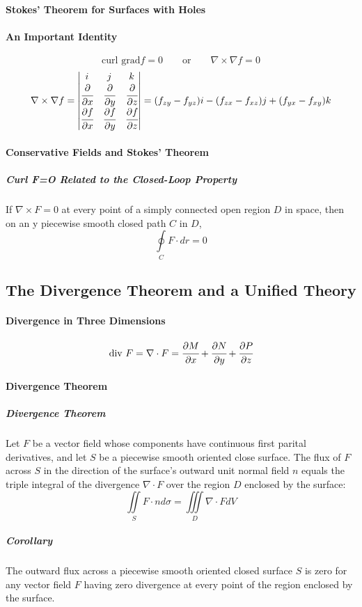\documentclass{article}
\begin{document}
            \paragraph{Stokes' Theorem for Surfaces with Holes}
            \paragraph{An Important Identity}
                \[\text{curl grad} f=0\qquad \text{or}\qquad \nabla\times\nabla f=0\]
                \[\nabla\times\nabla f=
                \begin{vmatrix}
                    i&j&k\\
                    \cfrac{\partial}{\partial x}&\cfrac{\partial}{\partial y}&\cfrac{\partial}{\partial z}\\
                    \cfrac{\partial f}{\partial x}&\cfrac{\partial f}{\partial y}&\cfrac{\partial f}{\partial z}\\
                \end{vmatrix}=(f_{zy}-f_{yz})i-(f_{zx}-f_{xz})j+(f_{yx}-f_{xy})k\]
            \paragraph{Conservative Fields and Stokes' Theorem}
                \subparagraph{Curl F=O Related to the Closed-Loop Property} If $\nabla\times F=0$ at every point of a simply connected open region $D$ in space, then on an y piecewise smooth closed path $C$ in $D$,
                \[\oint\limits_CF\cdot dr=0\]
        \subsection{The Divergence Theorem and a Unified Theory}
            \paragraph{Divergence in Three Dimensions}
                \[\text{div }F=\nabla\cdot F=\cfrac{\partial M}{\partial x}+\cfrac{\partial N}{\partial y}+\cfrac{\partial P}{\partial z}\]
            \paragraph{Divergence Theorem}
                \subparagraph{Divergence Theorem} Let $F$ be a vector field whose components have continuous first parital derivatives, and let $S$ be a piecewise smooth oriented close surface. The flux of $F$ across $S$ in the direction of the surface's outward unit normal field $n$ equals the triple integral of the divergence $\nabla\cdot F$ over the region $D$ enclosed by the surface:
                \[\iint\limits_SF\cdot nd\sigma=\iiint\limits_D\nabla\cdot FdV\]
                \subparagraph{Corollary} The outward flux across a piecewise smooth oriented closed surface $S$ is zero for any vector field $F$ having zero divergence at every point of the region enclosed by the surface.
\end{document}
